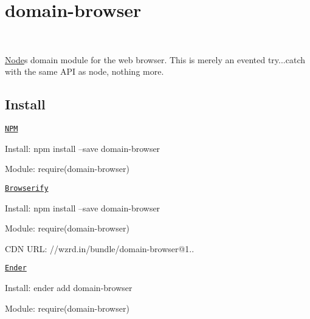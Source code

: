 \section*{domain-\/browser}

\href{http://travis-ci.org/bevry/domain-browser}{\tt } \href{https://npmjs.org/package/domain-browser}{\tt } \href{https://npmjs.org/package/domain-browser}{\tt } \href{https://david-dm.org/bevry/domain-browser}{\tt } \href{https://david-dm.org/bevry/domain-browser#info=devDependencies}{\tt } ~\newline
 \href{https://patreon.com/bevry}{\tt } \href{https://opencollective.com/bevry}{\tt } \href{https://www.gratipay.com/bevry}{\tt } \href{https://flattr.com/profile/balupton}{\tt } \href{https://bevry.me/paypal}{\tt } \href{https://bevry.me/bitcoin}{\tt } \href{https://bevry.me/wishlist}{\tt } ~\newline
 \href{https://slack.bevry.me}{\tt }

\mbox{\hyperlink{classNode}{Node}}\textquotesingle{}s domain module for the web browser. This is merely an evented try...catch with the same A\+PI as node, nothing more.

\subsection*{Install}

\href{https://npmjs.com}{\tt N\+PM}
\begin{DoxyItemize}
\item Install\+: {\ttfamily npm install --save domain-\/browser} 
\item Module\+: {\ttfamily require(\textquotesingle{}domain-\/browser\textquotesingle{})}
\end{DoxyItemize}

\href{http://browserify.org}{\tt Browserify}
\begin{DoxyItemize}
\item Install\+: {\ttfamily npm install --save domain-\/browser} 
\item Module\+: {\ttfamily require(\textquotesingle{}domain-\/browser\textquotesingle{})} 
\item C\+DN U\+RL\+: {\ttfamily //wzrd.in/bundle/domain-\/browser@1..}
\end{DoxyItemize}

\href{http://enderjs.com}{\tt Ender}
\begin{DoxyItemize}
\item Install\+: {\ttfamily ender add domain-\/browser} 
\item Module\+: {\ttfamily require(\textquotesingle{}domain-\/browser\textquotesingle{})}
\end{DoxyItemize}

